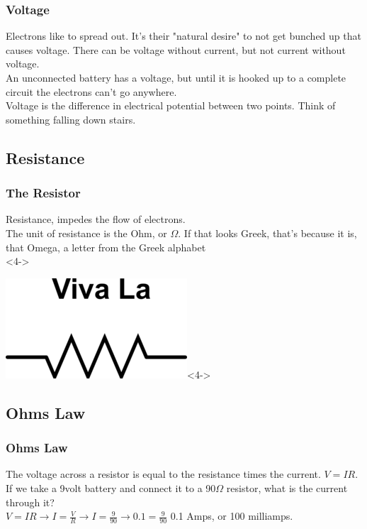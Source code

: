 \documentclass[10pt]{beamer}
\begin{document}
\begin{frame}
\frametitle{Voltage}
Electrons like to spread out. It's their "natural desire" to not get bunched up that causes voltage. There can be voltage without current, but not current without voltage.\\
An unconnected battery has a voltage, but until it is hooked up to a complete circuit the electrons can't go anywhere.\\
Voltage is the difference in electrical potential between two points. Think of something falling down stairs.
\end{frame}

\subsection{Resistance}

\begin{frame}
\frametitle{The Resistor}
Resistance, impedes the flow of electrons.\\
The unit of resistance is the Ohm, or $\Omega$. \pause If that looks Greek, that's because it is, that Omega, a letter from the Greek alphabet\\  <4->
\begin{center}
\includegraphics[width=.25\textwidth]{viva.png}<4->
\end{center}
\end{frame}

\subsection{Ohms Law}
\begin{frame}
\frametitle{Ohms Law}
The voltage across a resistor is equal to the resistance times the current. $V=IR$.\\
If we take a 9volt battery and connect it to a 90$\Omega$ resistor, what is the current through it?\pause\\
$V=IR\to I=\frac{V}{R}\to I=\frac{9}{90}$\pause$\to 0.1=\frac{9}{90}$ 0.1 Amps, or 100 milliamps.
\end{frame}
\end{document}
